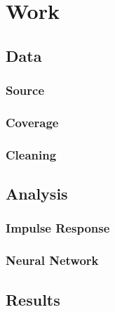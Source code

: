 \chapter[Work]{Work}

\section{Data}
\subsection{Source}
\subsection{Coverage}
\subsection{Cleaning}

\section{Analysis}
\subsection{Impulse Response}
\subsection{Neural Network}

\section{Results}